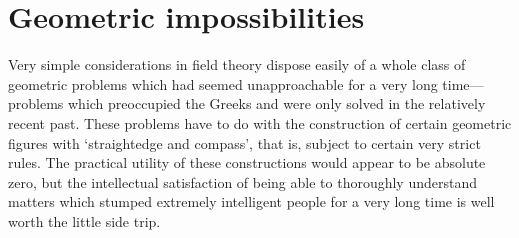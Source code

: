 \section{Geometric impossibilities}%
\label{sec:fields:geometric-impossibilities}

Very simple considerations in field theory dispose easily of a whole
class of geometric problems which had seemed unapproachable for a very
long time---problems which preoccupied the Greeks and were only solved
in the relatively recent past. These problems have to do with the
construction of certain geometric figures with `straightedge and
compass', that is, subject to certain very strict rules. The practical
utility of these constructions would appear to be absolute zero, but
the intellectual satisfaction of being able to thoroughly understand
matters which stumped extremely intelligent people for a very long
time is well worth the little side trip.

